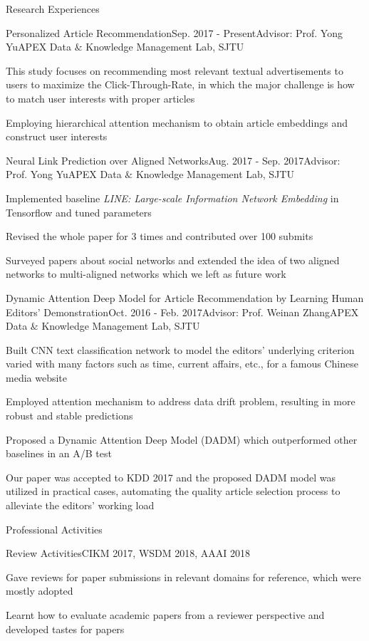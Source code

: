 \documentclass{resume} %
\begin{document}
\begin{rSection}{Research Experiences}
\begin{rSubsection}{Personalized Article Recommendation}{Sep. 2017 - Present}{Advisor: Prof. Yong Yu}{APEX Data $\&$ Knowledge Management Lab, SJTU}
\item This study focuses on recommending most relevant textual advertisements to users to maximize the Click-Through-Rate, in which the major challenge is how to match user interests with proper articles
\item Employing hierarchical attention mechanism to obtain article embeddings and construct user interests
\end{rSubsection}
\begin{rSubsection}{Neural Link Prediction over Aligned Networks}{Aug. 2017 - Sep. 2017}{Advisor: Prof. Yong Yu}{APEX Data $\&$ Knowledge Management Lab, SJTU}
\item Implemented baseline \emph{LINE: Large-scale Information Network Embedding} in Tensorflow and tuned parameters
\item Revised the whole paper for 3 times and contributed over 100 submits 
\item Surveyed papers about social networks and extended the idea of two aligned networks to multi-aligned networks which we left as future work
\end{rSubsection}
\begin{rSubsection}{Dynamic Attention Deep Model for Article Recommendation
by Learning Human Editors’ Demonstration}{Oct. 2016 - Feb. 2017}{Advisor: Prof. Weinan Zhang}{APEX Data $\&$ Knowledge Management Lab, SJTU}
\item Built CNN text classification network to model the editors' underlying criterion varied with many factors such as time, current affairs, etc., for a famous Chinese media website
\item Employed attention mechanism to address data drift problem, resulting in more robust and stable predictions
\item Proposed a Dynamic Attention Deep Model (DADM) which outperformed other baselines in an A/B test
\item Our paper was accepted to KDD 2017 and the proposed DADM model was utilized in practical cases, automating the quality article selection process to alleviate the editors' working load
\end{rSubsection}
\end{rSection}
\begin{rSection}{Professional Activities}
\begin{rSubsection}{Review Activities}{CIKM 2017, WSDM 2018, AAAI 2018}{}{}
\item Gave reviews for paper submissions in relevant domains for reference, which were mostly adopted
\item Learnt how to evaluate academic papers from a reviewer perspective and developed tastes for papers
\end{rSubsection}
\end{rSection}
\end{document}
